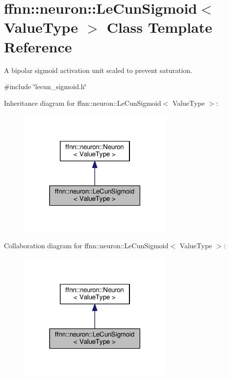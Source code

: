 \hypertarget{classffnn_1_1neuron_1_1_le_cun_sigmoid}{\section{ffnn\-:\-:neuron\-:\-:Le\-Cun\-Sigmoid$<$ Value\-Type $>$ Class Template Reference}
\label{classffnn_1_1neuron_1_1_le_cun_sigmoid}
}


A bipolar sigmoid activation unit scaled to prevent saturation.  




{\ttfamily \#include \char`\"{}lecun\-\_\-sigmoid.\-h\char`\"{}}



Inheritance diagram for ffnn\-:\-:neuron\-:\-:Le\-Cun\-Sigmoid$<$ Value\-Type $>$\-:
\nopagebreak
\begin{figure}[H]
\begin{center}
\leavevmode
\includegraphics[width=218pt]{classffnn_1_1neuron_1_1_le_cun_sigmoid__inherit__graph}
\end{center}
\end{figure}


Collaboration diagram for ffnn\-:\-:neuron\-:\-:Le\-Cun\-Sigmoid$<$ Value\-Type $>$\-:
\nopagebreak
\begin{figure}[H]
\begin{center}
\leavevmode
\includegraphics[width=218pt]{classffnn_1_1neuron_1_1_le_cun_sigmoid__coll__graph}
\end{center}
\end{figure}
